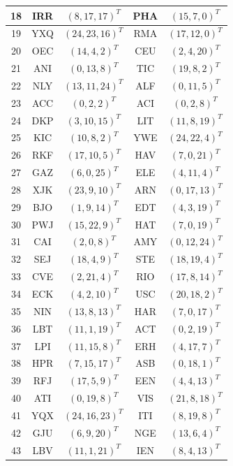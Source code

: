 \begin{longtable}{|c|c|c|c|c|}
  18 & IRR & $(8, 17, 17)^T$ & PHA & $(15, 7, 0)^T$ \\
  \hline
  19 & YXQ & $(24, 23, 16)^T$ & RMA & $(17, 12, 0)^T$ \\
  \hline
  20 & OEC & $(14, 4, 2)^T$ & CEU & $(2, 4, 20)^T$ \\
  \hline
  21 & ANI & $(0, 13, 8)^T$ & TIC & $(19, 8, 2)^T$ \\
  \hline
  22 & NLY & $(13, 11, 24)^T$ & ALF & $(0, 11, 5)^T$ \\
  \hline
  23 & ACC & $(0, 2, 2)^T$ & ACI & $(0, 2, 8)^T$ \\
  \hline
  24 & DKP & $(3, 10, 15)^T$ & LIT & $(11, 8, 19)^T$ \\
  \hline
  25 & KIC & $(10, 8, 2)^T$ & YWE & $(24, 22, 4)^T$ \\
  \hline
  26 & RKF & $(17, 10, 5)^T$ & HAV & $(7, 0, 21)^T$ \\
  \hline
  27 & GAZ & $(6, 0, 25)^T$ & ELE & $(4, 11, 4)^T$ \\
  \hline
  28 & XJK & $(23, 9, 10)^T$ & ARN & $(0, 17, 13)^T$ \\
  \hline
  29 & BJO & $(1, 9, 14)^T$ & EDT & $(4, 3, 19)^T$ \\
  \hline
  30 & PWJ & $(15, 22, 9)^T$ & HAT & $(7, 0, 19)^T$ \\
  \hline
  31 & CAI & $(2, 0, 8)^T$ & AMY & $(0, 12, 24)^T$ \\
  \hline
  32 & SEJ & $(18, 4, 9)^T$ & STE & $(18, 19, 4)^T$ \\
  \hline
  33 & CVE & $(2, 21, 4)^T$ & RIO & $(17, 8, 14)^T$ \\
  \hline
  34 & ECK & $(4, 2, 10)^T$ & USC & $(20, 18, 2)^T$ \\
  \hline
  35 & NIN & $(13, 8, 13)^T$ & HAR & $(7, 0, 17)^T$ \\
  \hline
  36 & LBT & $(11, 1, 19)^T$ & ACT & $(0, 2, 19)^T$ \\
  \hline
  37 & LPI & $(11, 15, 8)^T$ & ERH & $(4, 17, 7)^T$ \\
  \hline
  38 & HPR & $(7, 15, 17)^T$ & ASB & $(0, 18, 1)^T$ \\
  \hline
  39 & RFJ & $(17, 5, 9)^T$ & EEN & $(4, 4, 13)^T$ \\
  \hline
  40 & ATI & $(0, 19, 8)^T$ & VIS & $(21, 8, 18)^T$ \\
  \hline
  41 & YQX & $(24, 16, 23)^T$ & ITI & $(8, 19, 8)^T$ \\
  \hline
  42 & GJU & $(6, 9, 20)^T$ & NGE & $(13, 6, 4)^T$ \\
  \hline
  43 & LBV & $(11, 1, 21)^T$ & IEN & $(8, 4, 13)^T$ \\

\end{longtable}

